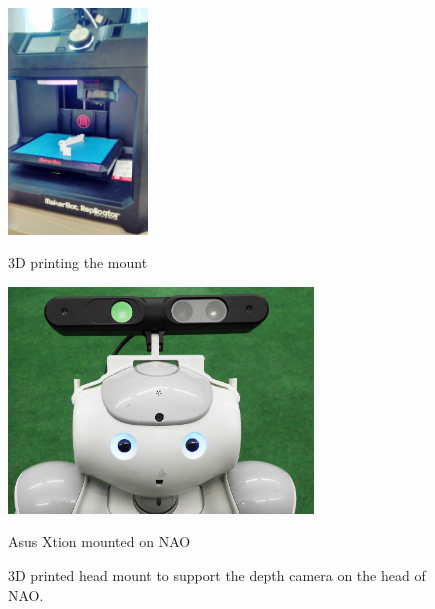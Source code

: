 \begin{figure}	 	
	\begin{minipage}
		{.45 
			\textwidth} 
		\centering 
		\includegraphics[height=60mm]{figures/content/xtion-mount-3d.jpg} \caption*{3D printing the mount} 
	\end{minipage}
	\begin{minipage}
		{.45 
			\textwidth}  
		\centering
		\includegraphics[height=60mm]{figures/content/xtion-mount.jpg} \caption*{Asus Xtion mounted on NAO}
	\end{minipage}	
	\caption{3D printed head mount to support the depth camera on the head of NAO.}
	\label{fg:xtion:mount}
\end{figure}



